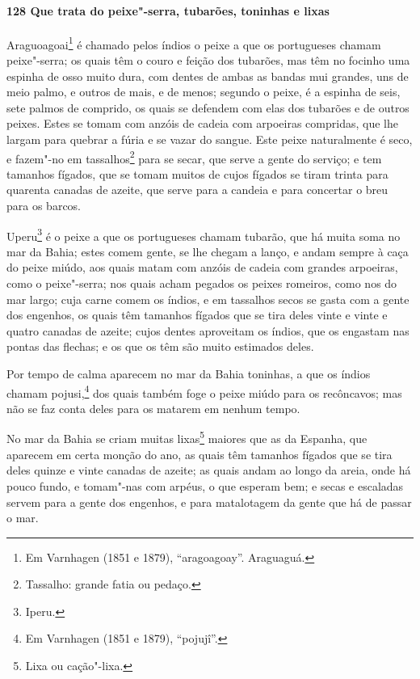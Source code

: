 \begin{linenumbers}
\paragraph{128 Que trata do peixe"-serra, tubarões, toninhas e lixas}\quad
Araguoagoai\footnote{ Em Varnhagen (1851 e 1879), ``aragoagoay''. Araguaguá.} é chamado
pelos índios o peixe a que os portugueses chamam peixe"-serra; os quais têm o couro e
feição dos tubarões, mas têm no focinho uma espinha de osso muito dura, com dentes de
ambas as bandas mui grandes, uns de meio palmo, e outros de mais, e de menos; segundo o
peixe, é a espinha de seis, sete palmos de comprido, os quais se defendem com elas dos
tubarões e de outros peixes. Estes se tomam com anzóis de cadeia com arpoeiras compridas,
que lhe largam para quebrar a fúria e se vazar do sangue. Este peixe naturalmente é seco,
e fazem"-no em tassalhos\footnote{ Tassalho: grande fatia ou pedaço.} para se secar, que
serve a gente do serviço; e tem tamanhos fígados, que se tomam muitos de cujos
fígados se tiram trinta para quarenta canadas de azeite, que serve para a candeia e para
concertar o breu para os barcos.

Uperu\footnote{ Iperu.} é o peixe a que os portugueses chamam tubarão, que há muita soma
no mar da Bahia; estes comem gente, se lhe chegam a lanço, e andam sempre à caça do peixe
miúdo, aos quais matam com anzóis de cadeia com grandes arpoeiras, como o peixe"-serra; nos
quais acham pegados os peixes romeiros, como nos do mar largo; cuja carne comem os índios,
e em tassalhos secos se gasta com a gente dos engenhos, os quais têm tamanhos fígados que
se tira deles vinte e vinte e quatro canadas de azeite; cujos dentes aproveitam os índios,
que os engastam nas pontas das flechas; e os que os têm são muito estimados deles.

Por tempo de calma aparecem no mar da Bahia toninhas, a que os índios chamam
pojusi,\footnote{ Em Varnhagen (1851 e 1879), ``pojujî''.} dos quais também foge o peixe
miúdo para os recôncavos; mas não se faz conta deles para os matarem em nenhum tempo.

No mar da Bahia se criam muitas lixas\footnote{ Lixa ou cação"-lixa.} maiores que as da
Espanha, que aparecem em certa monção do ano, as quais têm tamanhos fígados que se tira
deles quinze e vinte canadas de azeite; as quais andam ao longo da areia, onde há pouco
fundo, e tomam"-nas com arpéus, o que esperam bem; e secas e escaladas servem para a gente
dos engenhos, e para matalotagem da gente que há de passar o mar.


\end{linenumbers}
